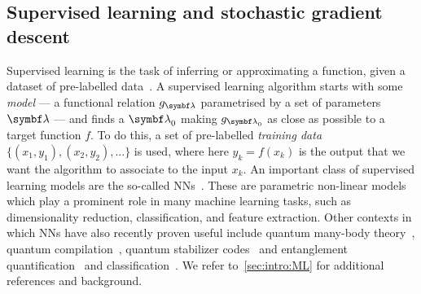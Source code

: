 \subsection{Supervised learning and stochastic gradient descent}
\label{subsec:GL:supervised_learning_and_SGD}

Supervised learning is the task of inferring or approximating a function, given a dataset of pre-labelled data~\cite{bishop2006pattern,mohri2012foundations}.
A supervised learning algorithm starts with some \emph{model} --- a functional relation $g_{\bslambda}$ parametrised by a set of parameters $\bslambda$ --- and finds a $\bslambda_0$ making $g_{\bslambda_0}$ as close as possible to a target function $f$.
To do this, a set of pre-labelled \emph{training data} $\{ (x_1, y_1), (x_2,y_2), ...\}$ is used,
where here $y_k=f(x_k)$ is the output that we want the algorithm to associate to the input $x_k$.
An important class of supervised learning models are the so-called \acp{NN}~\cite{hechtnielsen1989theory,haykin1998neural}.
These are parametric non-linear models which play a prominent role in many machine learning tasks, such as dimensionality reduction, classification, and feature extraction.
Other contexts in which \acp{NN} have also recently proven useful include quantum many-body theory~\cite{amin2016quantum,wang2016discovering,hush2017machine,carleo2017solving,carrasquilla2017machine,torlai2017manybody,broecker2017quantum,deng2017quantum},
quantum compilation~\cite{swaddle2017generating}, quantum stabilizer codes~\cite{krastanov2017deep} and entanglement quantification~\cite{gray2018machinelearningassisted} and classification~\cite{harney2019entanglement}. We refer to~\cref{sec:intro:ML} for additional references and background.

